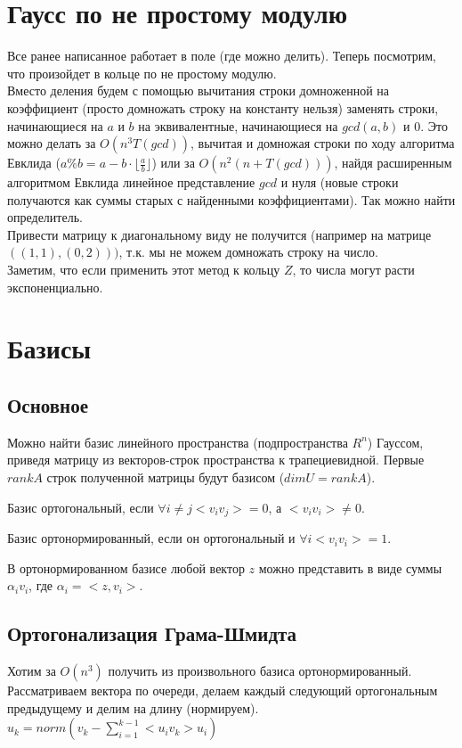 \section{Гаусс по не простому модулю}
Все ранее написанное работает в поле (где можно делить). Теперь посмотрим, что произойдет в кольце по не простому модулю.\\
Вместо деления будем с помощью вычитания строки домноженной на коэффициент (просто домножать строку на константу нельзя) заменять строки, начинающиеся на $a$ и $b$ на эквивалентные, начинающиеся на $gcd(a, b)$ и $0$. Это можно делать за $O(n^3T(gcd))$, вычитая и домножая строки по ходу алгоритма Евклида ($a\%b=a-b\cdot \lfloor\frac{a}{b}\rfloor$) или за $O(n^2(n+T(gcd)))$, найдя расширенным алгоритмом Евклида линейное представление $gcd$ и нуля (новые строки получаются как суммы старых с найденными коэффициентами). Так можно найти определитель.\\ Привести матрицу к диагональному виду не получится (например на матрице $((1, 1), (0, 2)))$, т.к. мы не можем домножать строку на число.\\
Заметим, что если применить этот метод к кольцу $Z$, то числа могут расти экспоненциально.
\section{Базисы}
\subsection{Основное}
Можно найти базис линейного пространства (подпространства $R^n$) Гауссом, приведя матрицу из векторов-строк пространства к трапециевидной. Первые $rank A$ строк полученной матрицы будут базисом ($dim U = rank A$).\\
\begin{Def}
Базис ортогональный, если $\forall i \ne j <v_iv_j> = 0$, а $<v_iv_i> \ne 0$.
\end{Def}
\begin{Def}
Базис ортонормированный, если он ортогональный и $\forall i <v_iv_i>=1$.
\end{Def}
В ортонормированном базисе любой вектор $z$ можно представить в виде суммы $\alpha_iv_i$, где $\alpha_i = <z, v_i>$.\\
\subsection{Ортогонализация Грама-Шмидта}
Хотим за $O(n^3)$ получить из произвольного базиса ортонормированный. Рассматриваем вектора по очереди, делаем каждый следующий ортогональным предыдущему и делим на длину (нормируем). $u_k = norm(v_k-\sum_{i=1}^{k-1}{<u_iv_k> u_i})$

